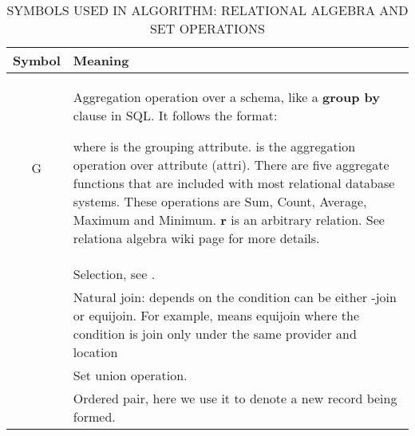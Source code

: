 \documentclass[journal]{IEEEtran}
\begin{document}
\begin{table}[!h]
\begin{center}\caption{SYMBOLS USED IN ALGORITHM: RELATIONAL ALGEBRA AND SET OPERATIONS} \label{table:relational_algebra_set}
\begin{tabular}{|c|p{6cm}|}
\hline
\textbf{Symbol }& \textbf{Meaning } \\
\hline 
G & 
    Aggregation operation over a schema, like a \textbf{group by} clause in SQL.
    It follows the format:
    
    where  is the grouping attribute.
     is the aggregation operation over attribute (attri). 
    There are five aggregate functions that are included with most relational database systems.
    These operations are Sum, Count, Average, Maximum and Minimum.
    \textbf{r} is an arbitrary relation.
    See relationa algebra wiki page \cite{ref36} for more details.\\
    
\hline  &  Selection, see \cite{ref36}.\\
\hline  & Natural join: depends on the condition can be either -join or equijoin. For example,  means equijoin where the condition is join only under the same provider and location\\
\hline    & Set union operation. \\
\hline  & Ordered pair, here we use it to denote a new record being formed.\\
\hline
\end{tabular}
\end{center}
\end{table}
\end{document}
